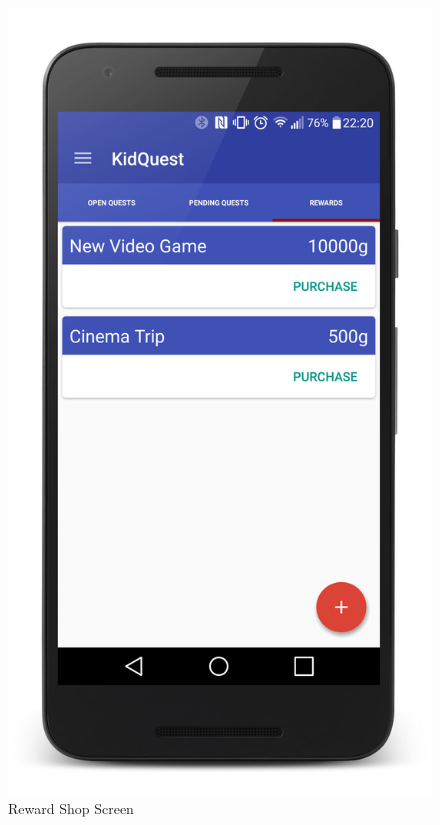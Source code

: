 \begin{figure}[ht]
\begin{minipage}[b]{0.45\linewidth}
    \includegraphics[width=.8\linewidth]{../images/Screenshot/RewardShopScreen.jpg}
    \caption{Reward Shop Screen} 
    \vspace{4ex}
  \end{minipage} 
\end{figure}

